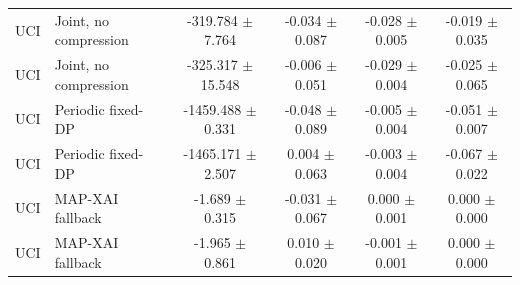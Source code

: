\begin{table}[t]
\begin{tabular}{llcccc}
UCI & Joint, no compression & -319.784 $\pm$ 7.764 & -0.034 $\pm$ 0.087 & -0.028 $\pm$ 0.005 & -0.019 $\pm$ 0.035 \\
UCI & Joint, no compression & -325.317 $\pm$ 15.548 & -0.006 $\pm$ 0.051 & -0.029 $\pm$ 0.004 & -0.025 $\pm$ 0.065 \\
UCI & Periodic fixed-DP & -1459.488 $\pm$ 0.331 & -0.048 $\pm$ 0.089 & -0.005 $\pm$ 0.004 & -0.051 $\pm$ 0.007 \\
UCI & Periodic fixed-DP & -1465.171 $\pm$ 2.507 & 0.004 $\pm$ 0.063 & -0.003 $\pm$ 0.004 & -0.067 $\pm$ 0.022 \\
UCI & MAP-XAI fallback & -1.689 $\pm$ 0.315 & -0.031 $\pm$ 0.067 & 0.000 $\pm$ 0.001 & 0.000 $\pm$ 0.000 \\
UCI & MAP-XAI fallback & -1.965 $\pm$ 0.861 & 0.010 $\pm$ 0.020 & -0.001 $\pm$ 0.001 & 0.000 $\pm$ 0.000 \\
\bottomrule
\end{tabular}
\end{table}
